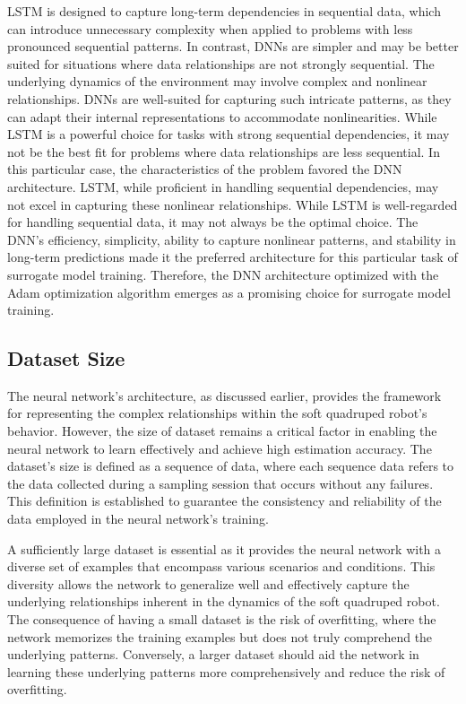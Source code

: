 LSTM is designed to capture long-term dependencies in sequential data, which can introduce unnecessary complexity when applied to problems with less pronounced sequential patterns. In contrast, DNNs are simpler and may be better suited for situations where data relationships are not strongly sequential. The underlying dynamics of the environment may involve complex and nonlinear relationships. DNNs are well-suited for capturing such intricate patterns, as they can adapt their internal representations to accommodate nonlinearities. While LSTM is a powerful choice for tasks with strong sequential dependencies, it may not be the best fit for problems where data relationships are less sequential. In this particular case, the characteristics of the problem favored the DNN architecture. LSTM, while proficient in handling sequential dependencies, may not excel in capturing these nonlinear relationships. While LSTM is well-regarded for handling sequential data, it may not always be the optimal choice. The DNN's efficiency, simplicity, ability to capture nonlinear patterns, and stability in long-term predictions made it the preferred architecture for this particular task of surrogate model training. Therefore, the DNN architecture optimized with the Adam optimization algorithm emerges as a promising choice for surrogate model training.

\subsection{Dataset Size}
The neural network's architecture, as discussed earlier, provides the framework for representing the complex relationships within the soft quadruped robot's behavior. However, the size of dataset remains a critical factor in enabling the neural network to learn effectively and achieve high estimation accuracy. The dataset's size is defined as a sequence of data, where each sequence data refers to the data collected during a sampling session that occurs without any failures. This definition is established to guarantee the consistency and reliability of the data employed in the neural network's training.

A sufficiently large dataset is essential as it provides the neural network with a diverse set of examples that encompass various scenarios and conditions. This diversity allows the network to generalize well and effectively capture the underlying relationships inherent in the dynamics of the soft quadruped robot. The consequence of having a small dataset is the risk of overfitting, where the network memorizes the training examples but does not truly comprehend the underlying patterns. Conversely, a larger dataset should aid the network in learning these underlying patterns more comprehensively and reduce the risk of overfitting. 

